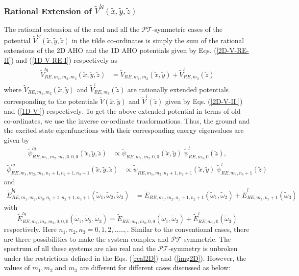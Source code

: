 \documentclass[a4paper, 12pt]{article}
\newcommand{\td}[1]{\tilde{#1}}
\begin{document}
\subsubsection{Rational Extension of $\td{V}^{lq}(\td{x}, \td{y}, \td{z})$}
The rational extension of the real and all the $\mathcal{PT}$-symmetric cases of the potential $\td{V}^{lq}(\td{x}, \td{y}, \td{z})$ in the tilde co-ordinates is simply the sum of the rational extensions of the 2D AHO and the 1D AHO potentials given by Eqs. (\ref{2D-V-RE-II}) and  (\ref{1D-V-RE-I}) respectively as
\begin{align}
  \begin{split}
    \td{V}^{lq}_{RE,m_1,m_2,m_3}(\td{x}, \td{y}, \td{z}) &= \td{V}_{RE,m_1,m_2}(\td{x}, \td{y})+\td{V}^l_{RE,m_3}(\td{z})
  \end{split}
\end{align}
where $\td{V}_{RE,m_1,m_2}(\td{x}, \td{y})$ and $\td{V}^l_{RE,m_3}(\td{z})$ are rationally extended potentials corresponding to the potentials $\td{V}(\td{x},\td{y})$ and $\td{V}^l(\td{z})$ given by Eqs. (\ref{2D-V-II'}) and (\ref{1D-V'}) respectively. To get the above extended potential in terms of old co-ordinates, we use the inverse co-ordinate trasformations. Thus, the ground and the excited state eigenfunctions with their corresponding energy eigenvalues are given by
\begin{align}
	\td{\psi}^{lq}_{RE,m_1,m_2,m_3,0,0,0}(\td{x}, \td{y}, \td{z})&\propto \td{\psi}_{RE,m_1,m_2,0,0}(\td{x}, \td{y})\;\td{\psi}^l_{RE,m_3,0}(\td{z}),
\end{align}
\begin{align}
  \td{\psi}^{lq}_{RE,m_1,m_2,m_3,n_1+1,n_2+1,n_3+1}(\td{x}, \td{y}, \td{z})&\propto \td{\psi}_{RE,m_1,m_2,n_1+1,n_2+1}(\td{x}, \td{y})\;\td{\psi}^l_{RE,m_3,n_3+1}(\td{z})
\end{align}
and 
\begin{align}
  \td{E}^{lq}_{RE,m_1,m_2,m_3,n_1+1,n_2+1,n_3+1}(\td{\omega}_1,\td{\omega}_2,\td{\omega}_3)&=\td{E}_{RE,m_1,m_2,n_1+1,n_2+1}(\td{\omega}_1,\td{\omega}_2)+\td{E}^l_{RE,m_3,n_3+1}(\td{\omega}_3)
\end{align}
with
\begin{equation}
	\td{E}^{lq}_{RE,m_1,m_2,m_3,0,0,0}(\td{\omega}_1,\td{\omega}_2,\td{\omega}_3)=\td{E}_{RE,m_1,m_2,0,0}(\td{\omega}_1,\td{\omega}_2)+\td{E}^l_{RE,m_3,0}(\td{\omega}_3)\nonumber
\end{equation}
respectively. Here $n_1,n_2,n_3=0,1,2,.....,$. Similar to the conventional cases, there are three possibilities to make the system complex and $\mathcal{PT}$-symmetric. The spectrum of all these systems are also real and the $\mathcal{PT}$-symmetry is unbroken under the restrictions defined in the Eqs. (\ref{real2D}) and (\ref{img2D}). However, the values of $m_1, m_2$ and $m_3$ are different for different cases discussed as below:
\end{document}
